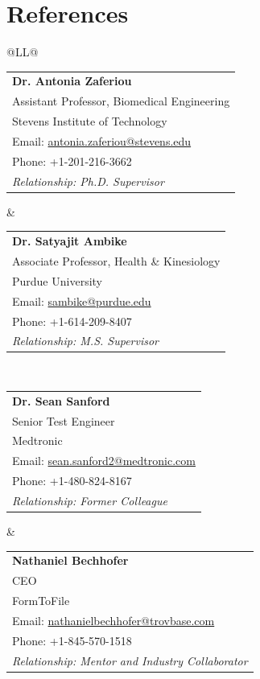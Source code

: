 \documentclass[letterpaper,11pt]{article}
\makeatletter
\newcommand{\resumeReference}[6]{%
\begin{tabular}[t]{@{}l@{}}
\textbf{#1}\\
#2\\
#3\\
Email: \href{mailto:#4}{#4}\\
Phone: #5\\
\textit{Relationship: #6}
\end{tabular}%
}
\makeatother
\begin{document}
\section{\textbf{References}}
\vspace{-0.2mm}
\small{
\begin{tabularx}{\textwidth}{@{}LL@{}}
\resumeReference{Dr. Antonia Zaferiou}
  {Assistant Professor, Biomedical Engineering}
  {Stevens Institute of Technology}
  {antonia.zaferiou@stevens.edu}{+1-201-216-3662}{Ph.D. Supervisor}
&
\resumeReference{Dr. Satyajit Ambike}
  {Associate Professor, Health \& Kinesiology}
  {Purdue University}
  {sambike@purdue.edu}{+1-614-209-8407}{M.S. Supervisor}
\\[4mm]
\resumeReference{Dr. Sean Sanford}
  {Senior Test Engineer}
  {Medtronic}
  {sean.sanford2@medtronic.com}{+1-480-824-8167}{Former Colleague}
&
\resumeReference{Nathaniel Bechhofer}
  {CEO}
  {FormToFile}
  {nathanielbechhofer@trovbase.com}{+1-845-570-1518}{Mentor and Industry Collaborator}
\end{tabularx}
}
\end{document}
